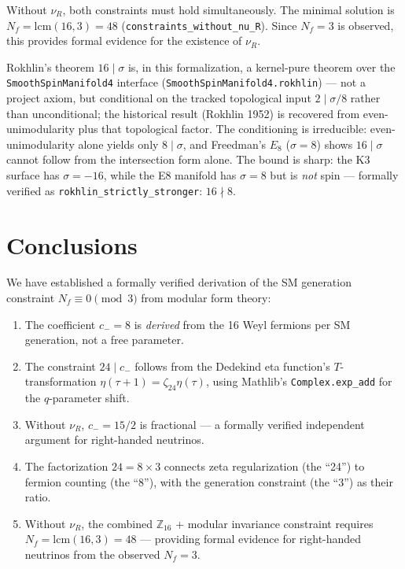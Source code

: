 \documentclass[aps,prl,twocolumn,superscriptaddress]{revtex4-2}
\begin{document}
Without $\nu_R$, both constraints must hold simultaneously.
The minimal solution is $N_f = \mathrm{lcm}(16, 3) = 48$
(\texttt{constraints\_without\_nu\_R}). Since $N_f = 3$ is observed,
this provides formal evidence for the existence of $\nu_R$.

Rokhlin's theorem $16 \mid \sigma$ is, in this formalization, a kernel-pure
theorem over the \texttt{SmoothSpinManifold4} interface
(\texttt{SmoothSpinManifold4.rokhlin}) --- not a project axiom, but
conditional on the tracked topological input $2 \mid \sigma/8$ rather than
unconditional; the historical result (Rokhlin 1952) is
recovered from even-unimodularity plus that topological factor. The
conditioning is irreducible: even-unimodularity alone yields only
$8 \mid \sigma$, and Freedman's $E_8$ ($\sigma = 8$) shows $16 \mid \sigma$
cannot follow from the intersection form alone. The bound is sharp: the K3 surface has
$\sigma = -16$, while the E8 manifold has $\sigma = 8$ but is
\emph{not} spin --- formally verified as
\texttt{rokhlin\_strictly\_stronger}: $16 \nmid 8$.

\section{Conclusions}

We have established a formally verified derivation of the SM generation
constraint $N_f \equiv 0 \pmod{3}$ from modular form theory:
\begin{enumerate}
\item The coefficient $c_- = 8$ is \emph{derived} from the 16 Weyl fermions
per SM generation, not a free parameter.
\item The constraint $24 \mid c_-$ follows from the Dedekind eta function's
$T$-transformation $\eta(\tau+1) = \zeta_{24} \eta(\tau)$, using Mathlib's
\texttt{Complex.exp\_add} for the $q$-parameter shift.
\item Without $\nu_R$, $c_- = 15/2$ is fractional --- a formally verified
independent argument for right-handed neutrinos.
\item The factorization $24 = 8 \times 3$ connects zeta regularization
(the ``24'') to fermion counting (the ``8''), with the generation
constraint (the ``3'') as their ratio.
\item Without $\nu_R$, the combined $\mathbb{Z}_{16}$ + modular invariance
constraint requires $N_f = \mathrm{lcm}(16,3) = 48$ --- providing formal
evidence for right-handed neutrinos from the observed $N_f = 3$.
\end{enumerate}
\end{document}
